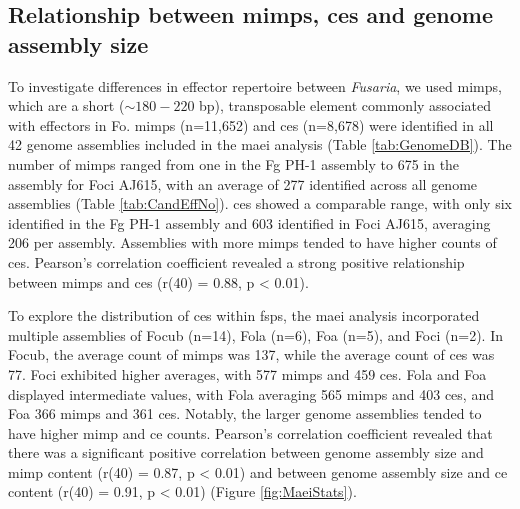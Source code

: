 \subsection{Relationship between \acp{mimp}, \aclp{ce} and genome assembly size}


To investigate differences in effector repertoire between \textit{Fusaria}, we used \acp{mimp}, which are a short ($\sim180 - 220$ bp), transposable element commonly associated with effectors in \ac{Fo}. \Acp{mimp} (n=11,652) and \acfp{ce} (n=8,678) were identified in all 42 genome assemblies included in the \ac{maei} analysis (Table \ref{tab:GenomeDB}). The number of \acp{mimp} ranged from one in the \ac{Fg} PH-1 assembly to 675 in the assembly for \ac{Foci} AJ615, with an average of 277 identified across all genome assemblies (Table \ref{tab:CandEffNo}). \Acp{ce} showed a comparable range, with only six identified in the \ac{Fg} PH-1 assembly and 603 identified in \ac{Foci} AJ615, averaging 206 per assembly. Assemblies with more \acp{mimp} tended to have higher counts of \acp{ce}. Pearson's correlation coefficient revealed a strong positive relationship between \acp{mimp} and \acp{ce} (r(40) = 0.88, p < 0.01). 



To explore the distribution of \acp{ce} within \acp{fsp}, the \ac{maei} analysis incorporated multiple assemblies of \ac{Focub} (n=14), \ac{Fola} (n=6), \ac{Foa} (n=5), and \ac{Foci} (n=2). In \ac{Focub}, the average count of \acp{mimp} was 137, while the average count of \acp{ce} was 77. \ac{Foci} exhibited higher averages, with 577 \acp{mimp} and 459 \acp{ce}. \ac{Fola} and \ac{Foa} displayed intermediate values, with \ac{Fola} averaging 565 \acp{mimp} and 403 \acp{ce}, and \ac{Foa} 366 \acp{mimp} and 361 \acp{ce}. Notably, the larger genome assemblies tended to have higher \ac{mimp} and \ac{ce} counts. Pearson's correlation coefficient revealed that there was a significant positive correlation between genome assembly size and \ac{mimp} content (r(40) = 0.87, p < 0.01) and between genome assembly size and \ac{ce} content (r(40) = 0.91, p < 0.01) (Figure \ref{fig:MaeiStats}). 

